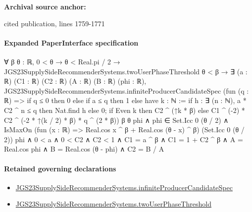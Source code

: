 \documentclass[10pt]{article}
\begin{document}
\textbf{Archival source anchor:} {\footnotesize\raggedright cited publication, lines 1759-\allowbreak{}1771\par}
\paragraph{Expanded PaperInterface specification}
\begin{ReviewVerbatim}
∀ {β θ : ℝ},
  0 < θ →
    θ < Real.pi / 2 →
      JGS23SupplySideRecommenderSystems.twoUserPhaseThreshold θ < β →
        ∃ (a : ℝ) (C1 : ℝ) (C2 : ℝ) (A : ℝ) (B : ℝ) (phi : ℝ),
          JGS23SupplySideRecommenderSystems.infiniteProducerCandidateSpec
              (fun (q : ℝ) =>
                if q ≤ 0 then 0
                else
                  if a ≤ q then 1
                  else
                    have k : ℕ := if h : ∃ (n : ℕ), a * C2 ^ n ≤ q then Nat.find h else 0;
                    if Even k then C2 ^ (↑k * β) else C1 ^ (-2) * C2 ^ (-2 * ↑(k / 2) * β) * q ^ (2 * β))
              β θ phi ∧
            phi ∈ Set.Icc 0 (θ / 2) ∧
              IsMaxOn (fun (x : ℝ) => Real.cos x ^ β + Real.cos (θ - x) ^ β) (Set.Icc 0 (θ / 2)) phi ∧
                0 < a ∧
                  0 < C2 ∧
                    C2 < 1 ∧ C1 = a ^ β ∧ C1 = 1 + C2 ^ β ∧ A = Real.cos phi ∧ B = Real.cos (θ - phi) ∧ C2 = B / A
\end{ReviewVerbatim}

\paragraph{Retained governing declarations}
\begin{itemize}\raggedright
\item \hyperlink{governing-declaration-6be812a4b679146a}{JGS23\allowbreak{}Supply\allowbreak{}Side\allowbreak{}Recommender\allowbreak{}Systems.\allowbreak{}infinite\allowbreak{}Producer\allowbreak{}Candidate\allowbreak{}Spec}
\item \hyperlink{governing-declaration-63bdc0df0d11c740}{JGS23\allowbreak{}Supply\allowbreak{}Side\allowbreak{}Recommender\allowbreak{}Systems.\allowbreak{}two\allowbreak{}User\allowbreak{}Phase\allowbreak{}Threshold}
\end{itemize}
\end{document}
